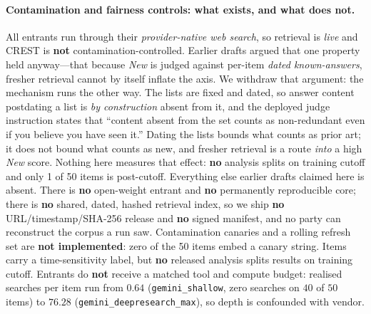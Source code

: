 \paragraph{Contamination and fairness controls: what exists, and what does not.} All entrants run
through their \emph{provider-native web search}, so retrieval is \emph{live} and CREST is
\textbf{not} contamination-controlled. Earlier drafts argued that one property held anyway---that
because \emph{New} is judged against per-item \emph{dated known-answers}, fresher retrieval cannot by
itself inflate the axis. We withdraw that argument: the mechanism runs the other way. The lists are
fixed and dated, so answer content postdating a list is \emph{by construction} absent from it, and the
deployed judge instruction states that ``content absent from the set counts as non-redundant even if
you believe you have seen it.'' Dating the lists bounds what counts as prior art; it does not bound
what counts as new, and fresher retrieval is a route \emph{into} a high \emph{New} score. Nothing here
measures that effect: \textbf{no} analysis splits on training cutoff and only 1 of 50 items is
post-cutoff. Everything else earlier drafts claimed here is absent.
There is \textbf{no} open-weight entrant and \textbf{no} permanently reproducible core; there is
\textbf{no} shared, dated, hashed retrieval index, so we ship \textbf{no} URL/timestamp/SHA-256
release and \textbf{no} signed manifest, and no party can reconstruct the corpus a run saw.
Contamination canaries and a rolling refresh set are \textbf{not implemented}: zero of the 50 items
embed a canary string. Items carry a time-sensitivity label, but \textbf{no} released analysis splits
results on training cutoff. Entrants do \textbf{not} receive a matched tool and compute budget:
realised searches per item run from $0.64$ (\texttt{gemini\_shallow}, zero searches on $40$ of $50$
items) to $76.28$ (\texttt{gemini\_deepresearch\_max}), so depth is confounded with vendor.
